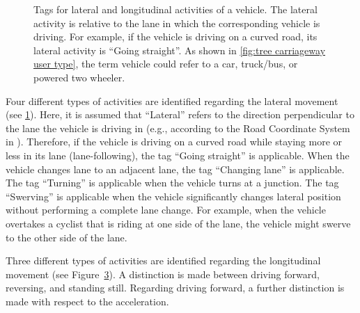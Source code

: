 \begin{figure}
	\centering
	\begin{subfigure}{\linewidth}
		\centering
		\caption{\vspace{0.5cm}}
		\label{fig:tree vehicle lat act}
	\end{subfigure}
	\begin{subfigure}{\linewidth}
		\centering
		\caption{}
		\label{fig:tree vehicle long act}
	\end{subfigure}
	\caption{Tags for lateral and longitudinal activities of a vehicle. The lateral activity is relative to the lane in which the corresponding vehicle is driving. For example, if the vehicle is driving on a curved road, its lateral activity is ``Going straight''. As shown in \cref{fig:tree carriageway user type}, the term vehicle could refer to a car, truck/bus, or powered two wheeler.}
\end{figure}

Four different types of activities are identified regarding the lateral movement (see \cref{fig:tree vehicle lat act}). Here, it is assumed that ``Lateral'' refers to the direction perpendicular to the lane the vehicle is driving in (e.g., according to the Road Coordinate System in \cite{zofka2015datadrivetrafficscenarios}). Therefore, if the vehicle is driving on a curved road while staying more or less in its lane (lane-following), the tag ``Going straight'' is applicable. When the vehicle changes lane to an adjacent lane, the tag ``Changing lane'' is applicable. The tag ``Turning'' is applicable when the vehicle turns at a junction. The tag ``Swerving'' is applicable when the vehicle significantly changes lateral position without performing a complete lane change. For example, when the vehicle overtakes a cyclist that is riding at one side of the lane, the vehicle might swerve to the other side of the lane. 

Three different types of activities are identified regarding the longitudinal movement (see Figure~\ref{fig:tree vehicle long act}). A distinction is made between driving forward, reversing, and standing still. Regarding driving forward, a further distinction is made with respect to the acceleration.


